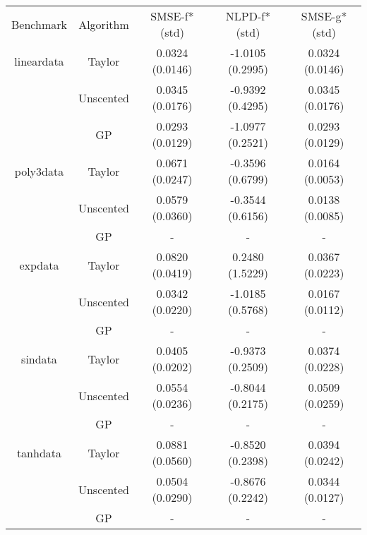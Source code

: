 \begin{tabular}{c c c c c}
Benchmark & Algorithm & SMSE-f* (std) & NLPD-f* (std) &SMSE-g* (std) \\ 
lineardata & Taylor & 0.0324 (0.0146) & -1.0105 (0.2995) & 0.0324 (0.0146) \\ 
& Unscented & 0.0345 (0.0176) & -0.9392 (0.4295) & 0.0345 (0.0176) \\ 
& GP & 0.0293 (0.0129) & -1.0977 (0.2521) & 0.0293 (0.0129) \\ 

poly3data & Taylor & 0.0671 (0.0247) & -0.3596 (0.6799) & 0.0164 (0.0053) \\ 
& Unscented & 0.0579 (0.0360) & -0.3544 (0.6156) & 0.0138 (0.0085) \\ 
& GP & - &  - &  -  \\ 

expdata & Taylor & 0.0820 (0.0419) & 0.2480 (1.5229) & 0.0367 (0.0223) \\ 
& Unscented & 0.0342 (0.0220) & -1.0185 (0.5768) & 0.0167 (0.0112) \\ 
& GP & - &  - &  -  \\ 

sindata & Taylor & 0.0405 (0.0202) & -0.9373 (0.2509) & 0.0374 (0.0228) \\ 
& Unscented & 0.0554 (0.0236) & -0.8044 (0.2175) & 0.0509 (0.0259) \\ 
& GP & - &  - &  -  \\ 

tanhdata & Taylor & 0.0881 (0.0560) & -0.8520 (0.2398) & 0.0394 (0.0242) \\ 
& Unscented & 0.0504 (0.0290) & -0.8676 (0.2242) & 0.0344 (0.0127) \\ 
& GP & - &  - &  -  \\ 

\end{tabular}